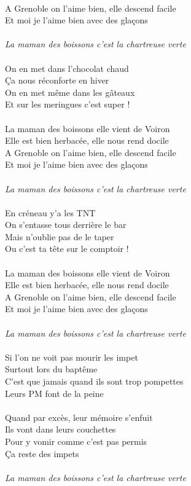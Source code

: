 \\A Grenoble on l'aime bien, elle descend facile 
\\Et moi je l'aime bien avec des glaçons 
\\\\\textit{La maman des boissons c'est la chartreuse verte}
\\\\On en met dans l'chocolat chaud
\\Ça nous réconforte en hiver
\\On en met même dans les gâteaux
\\Et sur les meringues c'est super !
\\\\La maman des boissons elle vient de Voiron 
\\Elle est bien herbacée, elle nous rend docile 
\\A Grenoble on l'aime bien, elle descend facile 
\\Et moi je l'aime bien avec des glaçons 
\\\\\textit{La maman des boissons c'est la chartreuse verte}
\\\\En créneau y'a les TNT 
\\On s'entasse tous derrière le bar 
\\Mais n'oublie pas de le taper 
\\Ou c'est ta tête sur le comptoir !
\\\\La maman des boissons elle vient de Voiron 
\\Elle est bien herbacée, elle nous rend docile 
\\A Grenoble on l'aime bien, elle descend facile 
\\Et moi je l'aime bien avec des glaçons 
\\\\\textit{La maman des boissons c'est la chartreuse verte}
\\\\Si l'on ne voit pas mourir les impet 
\\Surtout lors du baptême 
\\C'est que jamais quand ils sont trop pompettes
\\Leurs PM font de la peine 
\\\\Quand par excès, leur mémoire s'enfuit
\\Ils vont dans leurs couchettes
\\Pour y vomir comme c'est pas permis
\\Ça reste des impets 
\\\\\textit{La maman des boissons c'est la chartreuse verte}

\breakpage